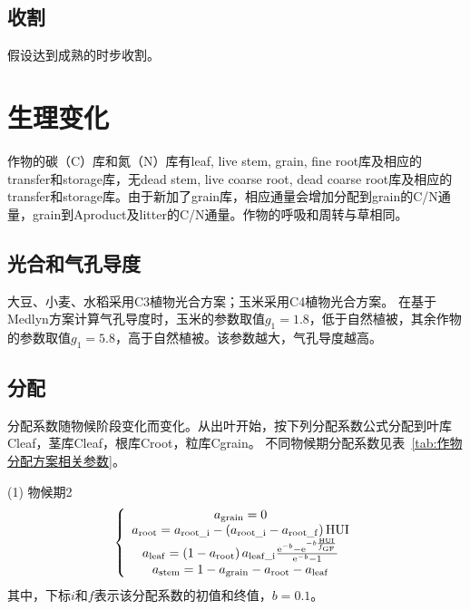 \subsection{收割}
假设达到成熟的时步收割。


\section{生理变化}
作物的碳（C）库和氮（N）库有leaf, live stem, grain, fine root库及相应的transfer和storage库，无dead stem, live coarse root, dead coarse root库及相应的transfer和storage库。由于新加了grain库，相应通量会增加分配到grain的C/N通量，grain到Aproduct及litter的C/N通量。作物的呼吸和周转与草相同。

\subsection{光合和气孔导度}
大豆、小麦、水稻采用C3植物光合方案；玉米采用C4植物光合方案。
在基于Medlyn方案计算气孔导度时，玉米的参数取值$g_1=1.8$，低于自然植被，其余作物的参数取值$g_1=5.8$，高于自然植被。该参数越大，气孔导度越高。

\subsection{分配}
分配系数随物候阶段变化而变化。从出叶开始，按下列分配系数公式分配到叶库Cleaf，茎库Cleaf，根库Croot，粒库Cgrain。
不同物候期分配系数见表~\ref{tab:作物分配方案相关参数}。

(1)	物候期2 \\
\begin{equation}
  \left\{\begin{array}{c}
      a_{\mathrm{grain}}=0 \\
      a_{\mathrm{root}}=a_{\mathrm{root\_i}}-\left(a_{\mathrm{root\_i}}-a_{\mathrm{root\_f}}\right) {\mathrm {HUI}} \\
      a_{\mathrm{leaf}}=\left(1-a_{\mathrm{root}}\right) a_{\mathrm{leaf\_i}} \frac{{\rm e}^{-{b}}-{\rm e}^{-b \frac{{\mathrm {HUI}}}{f_{\mathrm{GF}}}}}{{\rm e}^{-{b}}-1}   \\
      a_{\mathrm{stem}}=1-a_{\mathrm{grain}}-a_{\mathrm{root}}-a_{\mathrm{leaf}}
  \end{array}\right.
\end{equation}
其中，下标$i$和$f$表示该分配系数的初值和终值，$b=0.1$。

